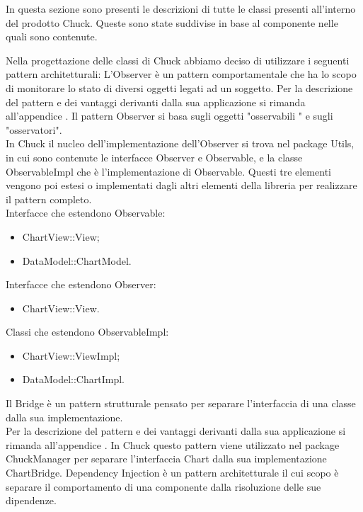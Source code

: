 		
		
		In questa sezione sono presenti le descrizioni di tutte le classi presenti all'interno del prodotto Chuck. Queste sono state suddivise in base al componente nelle quali sono contenute.
		
Nella progettazione delle classi di Chuck abbiamo deciso di utilizzare i seguenti pattern architetturali:
	L'Observer è un pattern comportamentale che ha lo scopo di monitorare lo stato di diversi oggetti legati ad un soggetto.
	Per la descrizione del pattern e dei vantaggi derivanti dalla sua applicazione si rimanda all'appendice .
	Il pattern Observer si basa sugli oggetti "osservabili " e sugli "osservatori". \\In Chuck il nucleo dell'implementazione dell'Observer si trova nel package Utils, in cui sono contenute le interfacce Observer e Observable, e la classe ObservableImpl che è l'implementazione di Observable. Questi tre elementi vengono poi estesi o implementati dagli altri elementi della libreria per realizzare il pattern completo.\\
	Interfacce che estendono Observable:
	\begin{itemize}
	\item ChartView::View;
	\item DataModel::ChartModel.
	\end{itemize}
	Interfacce che estendono Observer:
	\begin{itemize}
	\item ChartView::View.
	\end{itemize}
	Classi che estendono ObservableImpl:
	\begin{itemize}
	\item ChartView::ViewImpl;
	\item DataModel::ChartImpl.
	\end{itemize}
	Il Bridge è un pattern strutturale pensato per separare l'interfaccia di una classe dalla sua implementazione.\\ Per la descrizione del pattern e dei vantaggi derivanti dalla sua applicazione si rimanda all'appendice .
	In Chuck questo pattern viene utilizzato nel package ChuckManager per separare l'interfaccia Chart dalla sua implementazione ChartBridge.
	Dependency Injection è un pattern architetturale il cui scopo è separare il comportamento di una componente dalla risoluzione delle sue dipendenze.\\
